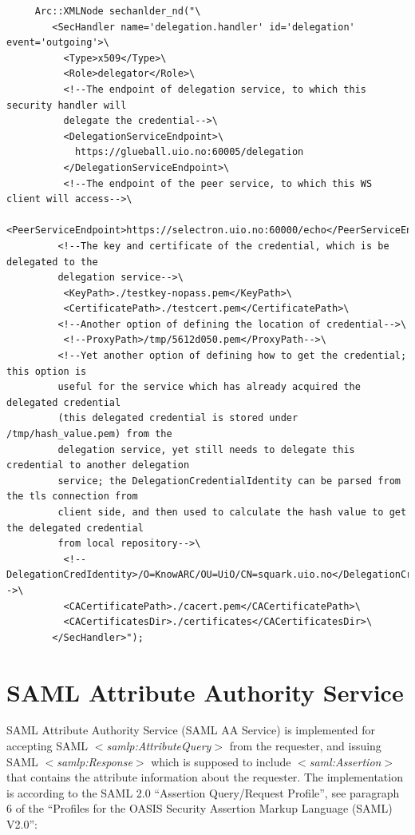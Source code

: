 \documentclass{article}                            %
\begin{document}
\begin{verbatim}
     Arc::XMLNode sechanlder_nd("\ 
        <SecHandler name='delegation.handler' id='delegation' event='outgoing'>\ 
          <Type>x509</Type>\ 
          <Role>delegator</Role>\ 
          <!--The endpoint of delegation service, to which this security handler will 
          delegate the credential-->\
          <DelegationServiceEndpoint>\
            https://glueball.uio.no:60005/delegation
          </DelegationServiceEndpoint>\ 
          <!--The endpoint of the peer service, to which this WS client will access-->\
          <PeerServiceEndpoint>https://selectron.uio.no:60000/echo</PeerServiceEndpoint>\ 
         <!--The key and certificate of the credential, which is be delegated to the 
         delegation service-->\
          <KeyPath>./testkey-nopass.pem</KeyPath>\ 
          <CertificatePath>./testcert.pem</CertificatePath>\ 
         <!--Another option of defining the location of credential-->\
          <!--ProxyPath>/tmp/5612d050.pem</ProxyPath-->\ 
         <!--Yet another option of defining how to get the credential; this option is 
         useful for the service which has already acquired the delegated credential 
         (this delegated credential is stored under /tmp/hash_value.pem) from the 
         delegation service, yet still needs to delegate this credential to another delegation 
         service; the DelegationCredentialIdentity can be parsed from the tls connection from 
         client side, and then used to calculate the hash value to get the delegated credential 
         from local repository-->\
          <!--DelegationCredIdentity>/O=KnowARC/OU=UiO/CN=squark.uio.no</DelegationCredIdentity-->\ 
          <CACertificatePath>./cacert.pem</CACertificatePath>\ 
          <CACertificatesDir>./certificates</CACertificatesDir>\ 
        </SecHandler>"); 
\end{verbatim}




\section{SAML Attribute Authority Service} %
\label{sec:saml_aa_service}
SAML Attribute Authority Service (SAML AA Service) is implemented for accepting SAML \textit{$<$samlp:AttributeQuery$>$} from the requester, and issuing SAML \textit{$<$samlp:Response$>$} which is supposed to include \textit{$<$saml:Assertion$>$} that contains the attribute information about the requester. The implementation is according to the SAML 2.0 ``Assertion Query/Request Profile'', see paragraph 6 of the ``Profiles for the OASIS Security Assertion Markup Language (SAML) V2.0'':
\end{document}
